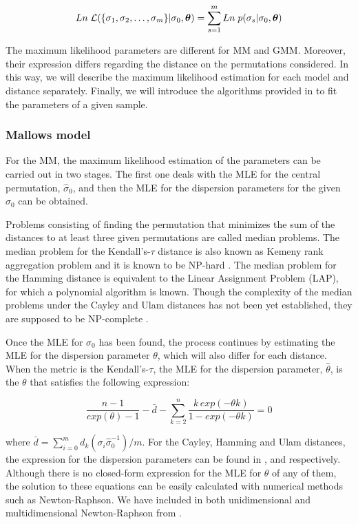 \documentclass[article,nojss]{jss}
\begin{document}
\[ Ln \;  {\cal L} ( \{\sigma_1, \sigma_2 , \ldots , \sigma_m\}  | \sigma_0, \boldsymbol \theta) = 
 \sum_{s=1}^{m} Ln \;p(\sigma_s | \sigma_0, \boldsymbol \theta) \]


The maximum likelihood parameters are different for MM and GMM. Moreover, their expression differs regarding the distance on the permutations considered. In this way, we will describe the maximum likelihood estimation for each model and distance separately. Finally, we will introduce the algorithms provided in  to fit the parameters of a given sample. 

\subsubsection{Mallows model}%
\label{sec:learning_mm}
For the MM, the maximum likelihood estimation of the parameters can be carried out in two stages. The first one deals with the MLE for the central permutation, $\hat \sigma_0$, and then the MLE for the dispersion parameters for the given $\hat \sigma_0$ can be obtained. 

Problems consisting of finding the permutation that minimizes the sum of the distances to at least three given permutations are called median problems. The median problem for the Kendall's-$\tau$ distance is also known as Kemeny rank aggregation problem and it is known to be NP-hard \citep{Bartholdi1989}. The median problem for the Hamming distance is equivalent to the Linear Assignment Problem (LAP), for which a polynomial algorithm is known. Though the complexity of the median problems under the Cayley and Ulam distances has not been yet established, they are supposed to be NP-complete \citep{Popov2007}. 

Once the MLE for $\sigma_0$ has been found, the process continues by estimating the MLE for the dispersion parameter $\theta$, which will also differ for each distance. When the metric is the Kendall's-$\tau$, the MLE for the dispersion parameter, $\hat \theta$, is the $\theta$ that satisfies the following expression:

\begin{equation}
  \frac{n-1 }{exp(\theta)-1} - \bar d -  \sum_{k=2}^{n} \frac{k\,exp(-\theta k)}{1-exp(-\theta k)} = 0	
\label{eq:theta_mm_kendall}
\end{equation}

where $\bar d=\sum_{i=0}^m d_k(\sigma_i  \hat \sigma_0^{-1})/m$. For the Cayley, Hamming and Ulam distances, the expression for the dispersion parameters can be found in \cite{Irurozki2014b}, \cite{Irurozki2014a} and \cite{Irurozki2014} respectively. Although there is no closed-form expression for the MLE for $\theta$ of any of them, the solution to these equations can be easily calculated with numerical methods such as Newton-Raphson. We have included in  both unidimensional and multidimensional Newton-Raphson from \cite{numerical_recipes_c}.
\end{document}
